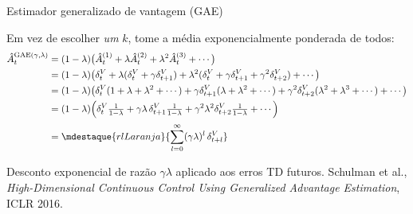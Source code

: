 \documentclass[aspectratio=169, 10pt]{beamer}
\newcommand{\Ahat}{\hat{A}}
\begin{document}
\begin{frame}{Estimador generalizado de vantagem (GAE)}

  Em vez de escolher \emph{um} $k$, tome a média exponencialmente ponderada de todos:
  {\small
  \begin{align*}
    \Ahat^{\mathrm{GAE}(\gamma,\lambda)}_t
      &= (1-\lambda)\bigl(\Ahat^{(1)}_t + \lambda \Ahat^{(2)}_t + \lambda^2\Ahat^{(3)}_t + \cdots\bigr)\\
      &= (1-\lambda)\bigl(\delta^V_t + \lambda(\delta^V_t + \gamma\delta^V_{t+1})
         + \lambda^2(\delta^V_t + \gamma\delta^V_{t+1} + \gamma^2\delta^V_{t+2}) + \cdots\bigr)\\
      &= (1-\lambda)\bigl(\delta^V_t(1+\lambda+\lambda^2+\cdots)
         + \gamma\delta^V_{t+1}(\lambda+\lambda^2+\cdots)
         + \gamma^2\delta^V_{t+2}(\lambda^2+\lambda^3+\cdots) + \cdots\bigr)\\
      &= (1-\lambda)\Bigl(\delta^V_t\tfrac{1}{1-\lambda}
         + \gamma\lambda\,\delta^V_{t+1}\tfrac{1}{1-\lambda}
         + \gamma^2\lambda^2\delta^V_{t+2}\tfrac{1}{1-\lambda} + \cdots\Bigr)\\[0.2em]
      &= \mdestaque{rlLaranja}{\sum_{l=0}^{\infty}(\gamma\lambda)^{l}\,\delta^V_{t+l}}
  \end{align*}}

  \vspace{-0.4em}
  \begin{ideiabox}
    Desconto exponencial de razão $\gamma\lambda$ aplicado aos erros TD futuros.
    Schulman et al., \emph{High-Dimensional Continuous Control Using Generalized
    Advantage Estimation}, ICLR 2016.
  \end{ideiabox}
\end{frame}
\end{document}
